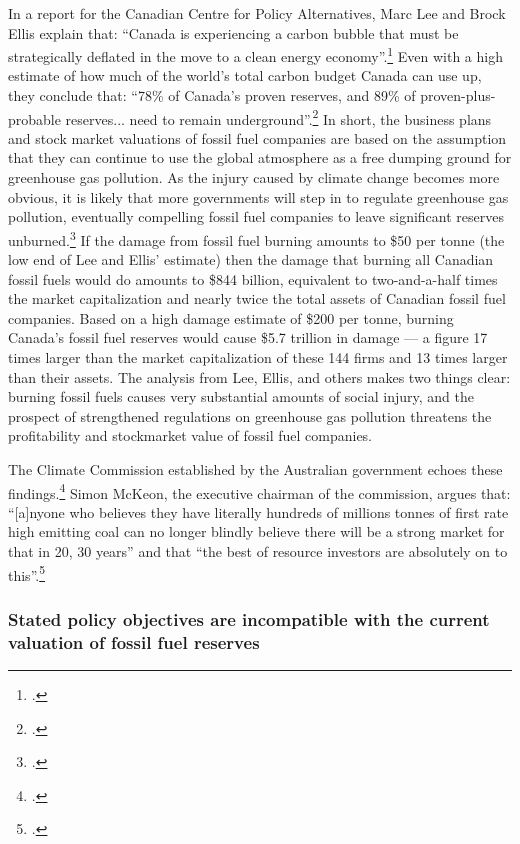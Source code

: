 In a report for the Canadian Centre for Policy Alternatives, Marc Lee and Brock Ellis explain that: ``Canada is experiencing a carbon bubble that must be strategically deflated in the move to a clean energy economy''.\footcite[][p.5]{CanadaCarbonLiabilities}
Even with a high estimate of how much of the world's total carbon budget Canada can use up, they conclude that: ``78\% of Canada’s proven reserves, and 89\% of proven-plus- probable reserves... need to remain underground''.\footcite[][p.6]{CanadaCarbonLiabilities}
In short, the business plans and stock market valuations of fossil fuel companies are based on the assumption that they can continue to use the global atmosphere as a free dumping ground for greenhouse gas pollution.
As the injury caused by climate change becomes more obvious, it is likely that more governments will step in to regulate greenhouse gas pollution, eventually compelling fossil fuel companies to leave significant reserves unburned.\footcite[See, for instance: ][]{ThreatenGrowth}
If the damage from fossil fuel burning amounts to \$50 per tonne (the low end of Lee and Ellis' estimate) then the damage that burning all Canadian fossil fuels would do amounts to \$844 billion, equivalent to two-and-a-half times the market capitalization and nearly twice the total assets of Canadian fossil fuel companies.
Based on a high damage estimate of \$200 per tonne, burning Canada's fossil fuel reserves would cause \$5.7 trillion in damage --- a figure 17 times larger than the market capitalization of these 144 firms and 13 times larger than their assets.
The analysis from Lee, Ellis, and others makes two things clear: burning fossil fuels causes very substantial amounts of social injury, and the prospect of strengthened regulations on greenhouse gas pollution threatens the profitability and stockmarket value of fossil fuel companies.



The Climate Commission established by the Australian government echoes these findings.\footcite[][]{CriticalDecade2013}
Simon McKeon, the executive chairman of the commission, argues that: ``[a]nyone who believes they have literally hundreds of millions tonnes of first rate high emitting  coal can no longer blindly believe there will be a strong market for that in 20, 30 years'' and that ``the best of resource investors are absolutely on to this''.\footcite[][]{CoalWillBeLeft}



	\subsubsection {Stated policy objectives are incompatible with the current valuation of fossil fuel reserves}



